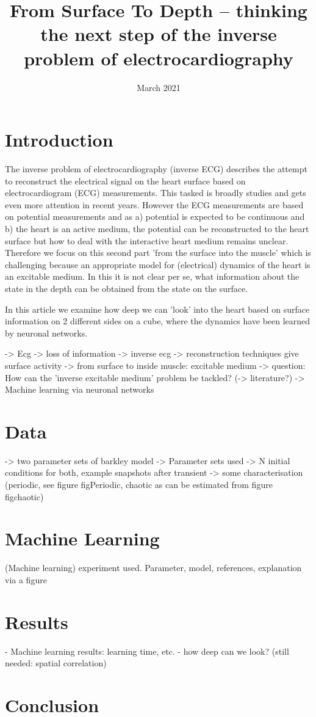 \documentclass{article}
\title{From Surface To Depth -- thinking the next step of the inverse problem of electrocardiography}
\author{}
\date{March 2021}
\begin{document}
\maketitle

\section{Introduction}
The inverse problem of electrocardiography (inverse ECG) describes the attempt to reconstruct the electrical signal on the heart surface based on electrocardiogram (ECG) measurements. This tasked is broadly studies \cite{many citations} and gets even more attention in recent years. However the ECG measurements are based on potential measurements and as a) potential is expected to be continuous and b) the heart is an active medium, the potential can be reconstructed to the heart surface but how to deal with the interactive heart medium remains unclear. Therefore we focus on this second part 'from the surface into the muscle' which is challenging because an appropriate model for (electrical) dynamics of the heart is an excitable medium. In this it is not clear per se, what information about the state in the depth can be obtained from the state on the surface.

In this article we examine how deep we can 'look' into the heart based on surface information on 2 different sides on a cube, where the dynamics have been learned by neuronal networks.


-> Ecg
-> loss of information
-> inverse ecg
-> reconstruction techniques give surface activity
-> from surface to inside muscle: excitable medium
-> question: How can the 'inverse excitable medium' problem be tackled?
(-> literature?)
-> Machine learning via neuronal networks

\section{Data}

-> two parameter sets of barkley model
-> Parameter sets used
-> N initial conditions for both, example snapshots after transient
-> some characterisation (periodic, see figure figPeriodic, chaotic as can be estimated from figure figchaotic)

\section{Machine Learning}
(Machine learning) experiment used. Parameter, model, references, explanation via a figure


\section{Results}
- Machine learning results: learning time, etc.
- how deep can we look? (still needed: spatial correlation)


\section{Conclusion}

% 
% 
\end{document}
